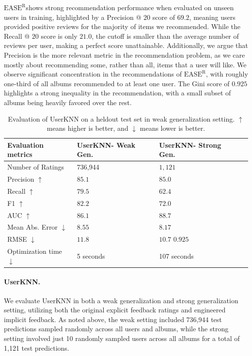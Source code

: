 \documentclass{article}
\newcommand{\easer}{$\text{EASE}^\text{R}$}
\newcommand{\userknn}{UserKNN\xspace}
\begin{document}
\easer shows strong recommendation performance when evaluated on unseen users
in training, highlighted by a Precision @ $20$ score of $69.2$, meaning users
provided
positive reviews for the majority of items we recommended.
While the Recall @ $20$ score is only $21.0$, the cutoff is smaller than the
 average number of reviews per user, making a perfect score unattainable.
Additionally, we argue that Precision is the more relevant metric in the
 recommendation problem, as we care mostly about recommending some, rather than
 all, items that a user will like.
We observe significant concentration in the recommendations of \easer, with
 roughly one-third of all albums recommended to at least one user.
The Gini score of $0.925$ highlights a strong inequality in the recommendation,
 with a small subset of albums being heavily favored over the rest.

\begin{table}[h]
\centering
\begin{tabular}{@{}llll@{}}
\toprule
Evaluation metrics    & \userknn - Weak Gen. & \userknn -
Strong Gen.
\\ \midrule
Number of Ratings			  & 736,944
&$1,121$ \\
Precision $\uparrow$	      & $85.1$		     & $85.0$
\\
Recall	$\uparrow$		& $79.5$	       & $62.4$
\\
F1	$\uparrow$		    & $82.2$		   &
$72.0$
\\
AUC $\uparrow$					& $86.1$
& $88.7$
\\
Mean Abs.
Error $\downarrow$	   & $8.55$		& $8.17$ \\ RMSE $\downarrow$
	   & $11.8$		&$10.7$ $0.925$ \\ Optimization time
 $\downarrow$ & 5 seconds & 107 seconds \\ \bottomrule \end{tabular}
 \caption{Evaluation of \userknn on a heldout test set in weak generalization
 setting.
$\uparrow$ means
higher is better, and $\downarrow$
means lower is better.}
\label{tab:userknn-results}

\end{table}

\paragraph*{\userknn.}
We evaluate \userknn in both a weak generalization and strong generalization
 setting, utilizing both the original explicit feedback ratings and engineered
 implicit feedback.
As noted above, the weak setting included 736,944 test predictions sampled
 randomly across all users and albums, while the strong setting involved just 10
 randomly sampled users across all albums for a total of 1,121 test predictions.
\end{document}

